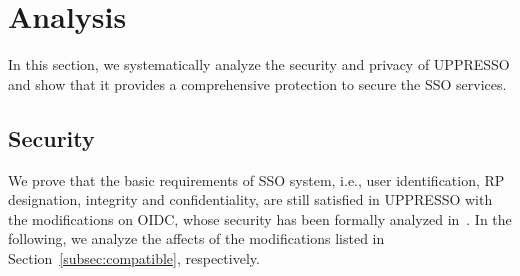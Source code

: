 \section{Analysis}
\label{sec:analysis}
In this section, we systematically analyze the security and privacy of UPPRESSO and show that it provides a comprehensive protection to secure the SSO services.

\subsection{Security}
\label{subsec:security}
We prove that the basic requirements of SSO system, i.e., user identification, RP designation, integrity and confidentiality, are still satisfied in UPPRESSO with the modifications on OIDC, whose security  has been formally analyzed in~\cite{FettKS17}.
In the following, we analyze the affects of the modifications listed in Section~\ref{subsec:compatible}, respectively.


